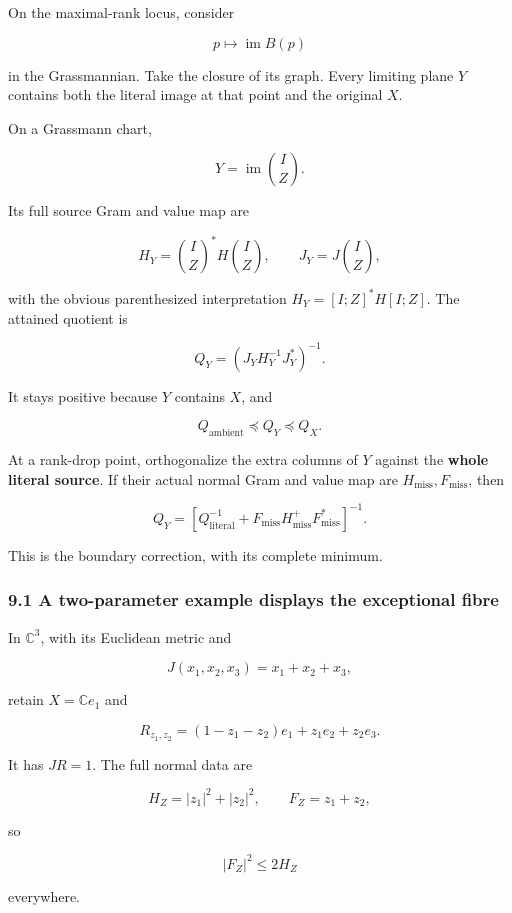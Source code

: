 \documentclass[11pt]{article}
\begin{document}
On the maximal-rank locus, consider

\[
p\longmapsto\operatorname{im}B(p)
\]

in the Grassmannian. Take the closure of its graph. Every limiting plane \(Y\) contains both the literal image at that point and the original \(X\).

On a Grassmann chart,

\[
Y=\operatorname{im}\binom I Z.
\]

Its full source Gram and value map are

\[
H_Y=\binom I Z^*H\binom I Z,
\qquad
J_Y=J\binom I Z,
\]

with the obvious parenthesized interpretation \(H_Y=[I;Z]^*H[I;Z]\). The attained quotient is

\[
\boxed{
Q_Y=(J_YH_Y^{-1}J_Y^*)^{-1}.
}
\tag{73}
\]

It stays positive because \(Y\) contains \(X\), and

\[
\boxed{
Q_{\mathrm{ambient}}\preceq Q_Y\preceq Q_X.
}
\tag{74}
\]

At a rank-drop point, orthogonalize the extra columns of \(Y\) against the \textbf{whole literal source}. If their actual normal Gram and value map are \(H_{\mathrm{miss}},F_{\mathrm{miss}}\), then

\[
\boxed{
Q_Y
=
\left[
Q_{\mathrm{literal}}^{-1}
+
F_{\mathrm{miss}}H_{\mathrm{miss}}^+
F_{\mathrm{miss}}^*
\right]^{-1}.
}
\tag{75}
\]

This is the boundary correction, with its complete minimum.

\subsubsection{9.1 A two-parameter example displays the exceptional fibre}\label{a-two-parameter-example-displays-the-exceptional-fibre}

In \(\mathbb C^3\), with its Euclidean metric and

\[
J(x_1,x_2,x_3)=x_1+x_2+x_3,
\]

retain \(X=\mathbb Ce_1\) and

\[
R_{z_1,z_2}
=
(1-z_1-z_2)e_1+z_1e_2+z_2e_3.
\]

It has \(JR=1\). The full normal data are

\[
H_Z=|z_1|^2+|z_2|^2,\qquad F_Z=z_1+z_2,
\]

so

\[
|F_Z|^2\le2H_Z
\]

everywhere.
\end{document}
